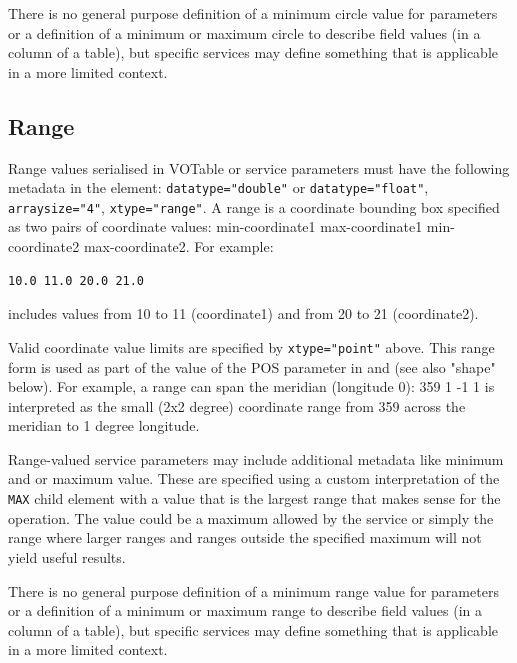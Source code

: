 \documentclass[11pt,letter]{ivoa}
\begin{document}
There is no general purpose definition of a minimum circle value for parameters or
a definition of a minimum or maximum circle to describe field values (in a column
of a table), but specific services may define something that is applicable in a
more limited context.

\subsection{Range}
Range values serialised in VOTable or service parameters must have the following
metadata in the  element: \verb|datatype="double"| or \verb|datatype="float"|,
\verb|arraysize="4"|, \verb|xtype="range"|. A range is a coordinate bounding box specified
as two pairs of coordinate values: min-coordinate1 max-coordinate1 min-coordinate2 max-coordinate2.
For example:

\begin{verbatim}
10.0 11.0 20.0 21.0
\end{verbatim}

includes values from 10 to 11 (coordinate1) and from 20 to 21 (coordinate2).

Valid coordinate value limits are specified by \verb|xtype="point"| above. 
This range form is used as part of the value of the POS parameter in 
\citep{2015ivoa.spec.1223D} and \citep{2017ivoa.spec.0517B} (see also "shape" below). 
For example, a range can span the meridian (longitude 0): 359 1 -1 1 is interpreted
as the small (2x2 degree) coordinate range from 359 across the meridian to 1 degree 
longitude.

Range-valued service parameters may include additional metadata like minimum and
or maximum value. These are specified using a custom interpretation of the
\verb|MAX| child element with a value that is the largest range that makes sense
for the operation. The value could be a maximum allowed by the service or simply
the range where larger ranges and ranges outside the specified maximum will not yield
useful results.

There is no general purpose definition of a minimum range value for parameters or
a definition of a minimum or maximum range to describe field values (in a column
of a table), but specific services may define something that is applicable in a
more limited context.
\end{document}

